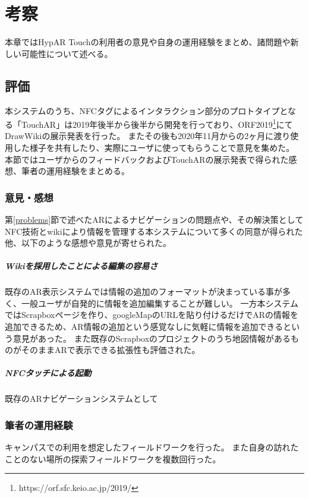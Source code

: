 \chapter{考察}
\label{chap:consideration}

本章ではHypAR Touchの利用者の意見や自身の運用経験をまとめ、諸問題や新しい可能性について述べる。

\newpage


\section{評価}
本システムのうち、NFCタグによるインタラクション部分のプロトタイプとなる「TouchAR」は2019年後半から後半から開発を行っており、ORF2019\footnote{ \textsf{https://orf.sfc.keio.ac.jp/2019/} }にてDrawWikiの展示発表を行った。
またその後も2020年11月からの2ヶ月に渡り使用した様子を共有したり、実際にユーザに使ってもらうことで意見を集めた。
本節ではユーザからのフィードバックおよびTouchARの展示発表で得られた感想、筆者の運用経験をまとめる。

\subsection{意見・感想}

第\ref{problems}節で述べたARによるナビゲーションの問題点や、その解決策としてNFC技術とwikiにより情報を管理する本システムについて多くの同意が得られた他、以下のような感想や意見が寄せられた。

\paragraph*{Wikiを採用したことによる編集の容易さ}
既存のAR表示システムでは情報の追加のフォーマットが決まっている事が多く、一般ユーザが自発的に情報を追加編集することが難しい。
一方本システムではScrapboxページを作り、googleMapのURLを貼り付けるだけでARの情報を追加できるため、AR情報の追加という感覚なしに気軽に情報を追加できるという意見があった。
また既存のScrapboxのプロジェクトのうち地図情報があるものがそのままARで表示できる拡張性も評価された。

\paragraph*{NFCタッチによる起動}
既存のARナビゲーションシステムとして

\subsection{筆者の運用経験}
キャンパスでの利用を想定したフィールドワークを行った。
また自身の訪れたことのない場所の探索フィールドワークを複数回行った。

